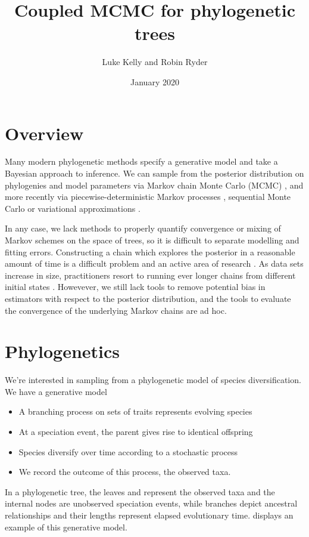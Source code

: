 \documentclass[11pt,a4paper]{article}
\title{\vspace{-2.5cm} Coupled MCMC for phylogenetic trees}
\author{Luke Kelly and Robin Ryder}
\date{January 2020}
\begin{document}
\maketitle
\tableofcontents

\section{Overview}

Many modern phylogenetic methods specify a generative model and take a Bayesian approach to inference. We can sample from the posterior distribution on phylogenies and model parameters via Markov chain Monte Carlo (MCMC) \citep{bouckaert19}, and more recently via piecewise-deterministic Markov processes \citep{zhang19,koskela20}, sequential Monte Carlo \citep{wang19} or variational approximations \citep{zhang19vb}.

In any case, we lack methods to properly quantify convergence or mixing of Markov schemes on the space of trees, so it is difficult to separate modelling and fitting errors. Constructing a chain which explores the posterior in a reasonable amount of time is a difficult problem and an active area of research \citep{whidden19}. As data sets increase in size, practitioners resort to running ever longer chains from different initial states \citep{whidden15}. Howevever, we still lack tools to remove potential bias in estimators with respect to the posterior distribution, and the tools to evaluate the convergence of the underlying Markov chains are ad hoc.

\section{Phylogenetics}

We're interested in sampling from a phylogenetic model of species diversification. We have a generative model
\begin{itemize}
    \item A branching process on sets of traits represents evolving species
    \item At a speciation event, the parent gives rise to identical offspring
    \item Species diversify over time according to a stochastic process
    \item We record the outcome of this process, the observed taxa.
\end{itemize}
In a phylogenetic tree, the leaves and represent the observed taxa and the internal nodes are unobserved speciation events, while branches depict ancestral relationships and their lengths represent elapsed evolutionary time.  displays an example of this generative model.
\end{document}
